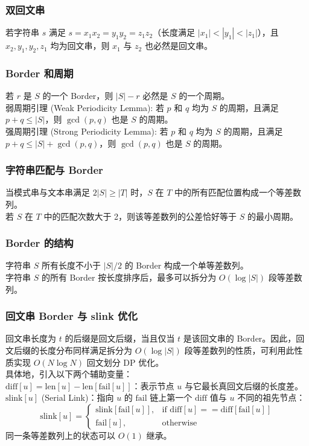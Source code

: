\subsubsection*{双回文串}
\noindent
若字符串 $s$ 满足 $s = x_1 x_2 = y_1 y_2 = z_1 z_2$（长度满足 $|x_1| < |y_1| < |z_1|$），且 $x_2, y_1, y_2, z_1$ 均为回文串，则 $x_1$ 与 $z_2$ 也必然是回文串。

\subsubsection*{Border 和周期}
\noindent
若 $r$ 是 $S$ 的一个 Border，则 $|S| - r$ 必然是 $S$ 的一个周期。\\
弱周期引理 (Weak Periodicity Lemma): 若 $p$ 和 $q$ 均为 $S$ 的周期，且满足 $p + q \le |S|$，则 $\gcd(p, q)$ 也是 $S$ 的周期。\\
强周期引理 (Strong Periodicity Lemma): 若 $p$ 和 $q$ 均为 $S$ 的周期，且满足 $p + q \le |S| + \gcd(p, q)$，则 $\gcd(p, q)$ 也是 $S$ 的周期。

\subsubsection*{字符串匹配与 Border}
\noindent
当模式串与文本串满足 $2|S| \ge |T|$ 时，$S$ 在 $T$ 中的所有匹配位置构成一个等差数列。\\
若 $S$ 在 $T$ 中的匹配次数大于 2，则该等差数列的公差恰好等于 $S$ 的最小周期。

\subsubsection*{Border 的结构}
\noindent
字符串 $S$ 所有长度不小于 $|S|/2$ 的 Border 构成一个单等差数列。\\
字符串 $S$ 的所有 Border 按长度排序后，最多可以拆分为 $O(\log |S|)$ 段等差数列。

\subsubsection*{回文串 Border 与 slink 优化}
\noindent
回文串长度为 $t$ 的后缀是回文后缀，当且仅当 $t$ 是该回文串的 Border。因此，回文后缀的长度分布同样满足拆分为 $O(\log |S|)$ 段等差数列的性质，可利用此性质实现 $O(N \log N)$ 回文划分 DP 优化。\\
具体地，引入以下两个辅助变量：\\
$\text{diff}[u] = \text{len}[u] - \text{len}[\text{fail}[u]]$：表示节点 $u$ 与它最长真回文后缀的长度差。\\
$\text{slink}[u]$ (Serial Link)：指向 $u$ 的 $\text{fail}$ 链上第一个 $\text{diff}$ 值与 $u$ 不同的祖先节点：
\[
\text{slink}[u] = \begin{cases} \text{slink}[\text{fail}[u]], & \text{if } \text{diff}[u] == \text{diff}[\text{fail}[u]] \\ \text{fail}[u], & \text{otherwise} \end{cases}
\]
同一条等差数列上的状态可以 $O(1)$ 继承。

